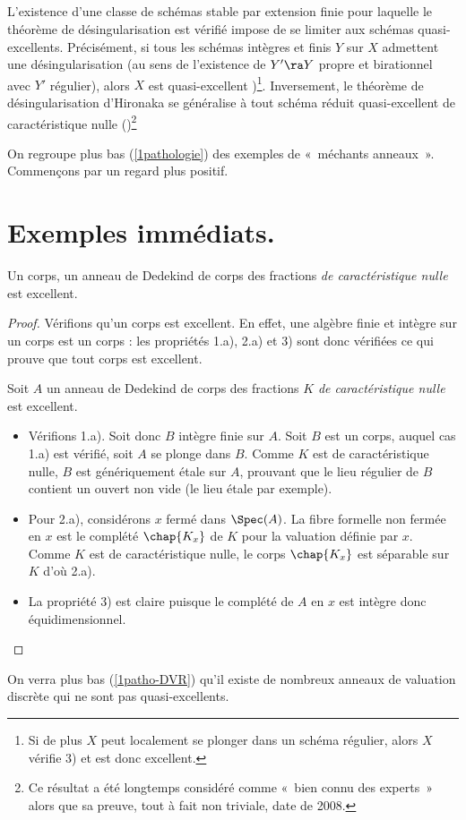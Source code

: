 \documentclass[10pt]{../fichiers-configuration-latex/smfart}
\begin{document}
\subsection{}\label{1desing} L'existence d'une classe de schémas stable par extension finie pour
laquelle le théorème de désingularisation est vérifié impose de se limiter aux schémas
quasi-excellents. Précisément, si tous les schémas intègres et finis $Y$ sur $X$ admettent une
désingularisation (au sens de l'existence de $Y'\ra Y$ propre et birationnel avec $Y'$ régulier),
alors $X$ est quasi-excellent )\footnote{Si de plus $X$ peut localement se
plonger dans un schéma régulier, alors $X$ vérifie 3) et est donc excellent.}.  Inversement, le
théorème de désingularisation d'Hironaka se généralise à tout schéma réduit quasi-excellent de
caractéristique nulle (\cite[3.4.3]{desingularization@Temkin})\footnote{Ce résultat a été longtemps
considéré comme « bien connu des experts » alors que sa preuve, tout à fait non triviale, date
de 2008.}

On regroupe plus bas (\ref{1pathologie}) des exemples de « méchants anneaux ». Commençons par un
regard plus positif.

\section{Exemples immédiats.}

\begin{proposition} Un corps, un anneau de Dedekind de corps des fractions \emph{de caractéristique
nulle} est excellent.\end{proposition}

\begin{proof} Vérifions qu'un corps est excellent. En effet, une algèbre finie et intègre sur un
corps est un corps : les propriétés 1.a), 2.a) et 3) sont donc vérifiées ce qui prouve que tout
corps est excellent.

\medskip

Soit $A$ un anneau de Dedekind de corps des fractions $K$ \emph{de caractéristique nulle} est
excellent.

\begin{itemize} \item Vérifions 1.a). Soit donc $B$ intègre finie sur $A$. Soit $B$ est un corps,
auquel cas 1.a) est vérifié, soit $A$ se plonge dans $B$. Comme $K$ est de caractéristique nulle,
$B$ est génériquement étale sur $A$, prouvant que le lieu régulier de $B$ contient un ouvert non
vide (le lieu étale par exemple).  \item Pour 2.a), considérons $x$ fermé dans $\Spec(A)$. La fibre
formelle non fermée en $x$ est le complété $\chap{ K_x}$ de $K$ pour la valuation définie par $x$.
Comme $K$ est de caractéristique nulle, le corps $\chap{ K_x}$ est séparable sur $K$ d'où 2.a).
\item La propriété 3) est claire puisque le complété de $A$ en $x$ est intègre donc
équidimensionnel.  \end{itemize} \end{proof} On verra plus bas (\ref{1patho-DVR}) qu'il existe de
nombreux anneaux de valuation discrète qui ne sont pas quasi-excellents.
\end{document}
